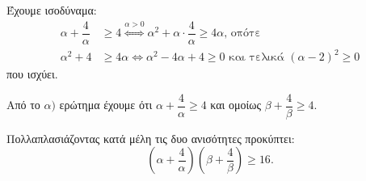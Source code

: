 
\begin{alist}
\item Έχουμε ισοδύναμα:
\begin{align*}
\alpha + \dfrac{4}{\alpha} &\ge 4 \overset{\alpha > 0}{\Leftrightarrow} 
\alpha^2 + \alpha \cdot \dfrac{4}{\alpha} \ge 4\alpha\text{, οπότε} \\
\alpha^2 + 4 &\ge 4\alpha\Leftrightarrow
\alpha^2 - 4\alpha + 4 \ge 0\text{ και τελικά }(\alpha - 2)^2 \ge 0
\end{align*}
που ισχύει.

\item Από το $\alpha)$ ερώτημα έχουμε ότι $\alpha + \dfrac{4}{\alpha} \ge 4$ και ομοίως $\beta + \dfrac{4}{\beta} \ge 4$.

Πολλαπλασιάζοντας κατά μέλη τις δυο ανισότητες προκύπτει:
\[\left( \alpha + \dfrac{4}{\alpha} \right) \left( \beta + \dfrac{4}{\beta} \right) \ge 16.\]
\end{alist}

